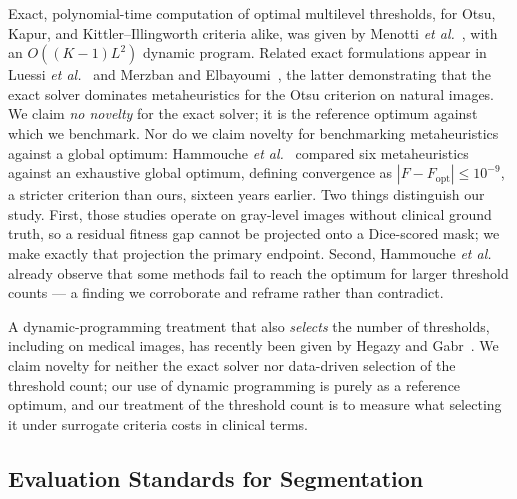 Exact, polynomial-time computation of optimal multilevel thresholds, for
Otsu, Kapur, and Kittler--Illingworth criteria alike, was given by Menotti
\emph{et al.}~\cite{menotti_ciarp}, with an $O((K-1)L^2)$ dynamic program.
Related exact formulations appear in Luessi \emph{et al.}~\cite{luessi_jei} and
Merzban and Elbayoumi~\cite{merzban_eswa}, the latter demonstrating that the
exact solver dominates metaheuristics for the Otsu criterion on natural images.
We claim \emph{no novelty} for the exact solver; it is the reference optimum
against which we benchmark. Nor do we claim novelty for benchmarking
metaheuristics against a global optimum: Hammouche \emph{et
al.}~\cite{hammouche_eaai} compared six metaheuristics against an exhaustive
global optimum, defining convergence as $|F - F_{\mathrm{opt}}| \le 10^{-9}$, a
stricter criterion than ours, sixteen years earlier. Two things distinguish our
study. First, those studies operate on gray-level images without clinical ground
truth, so a residual fitness gap cannot be projected onto a Dice-scored mask; we
make exactly that projection the primary endpoint. Second, Hammouche \emph{et
al.} already observe that some methods fail to reach the optimum for larger
threshold counts --- a finding we corroborate and reframe rather than contradict.

A dynamic-programming treatment that also \emph{selects} the number of
thresholds, including on medical images, has recently been given by Hegazy and
Gabr~\cite{hegazy_dp}. We claim novelty for neither the exact solver nor
data-driven selection of the threshold count; our use of dynamic programming is
purely as a reference optimum, and our treatment of the threshold count is to
measure what selecting it under surrogate criteria costs in clinical terms.

\subsection{Evaluation Standards for Segmentation}

